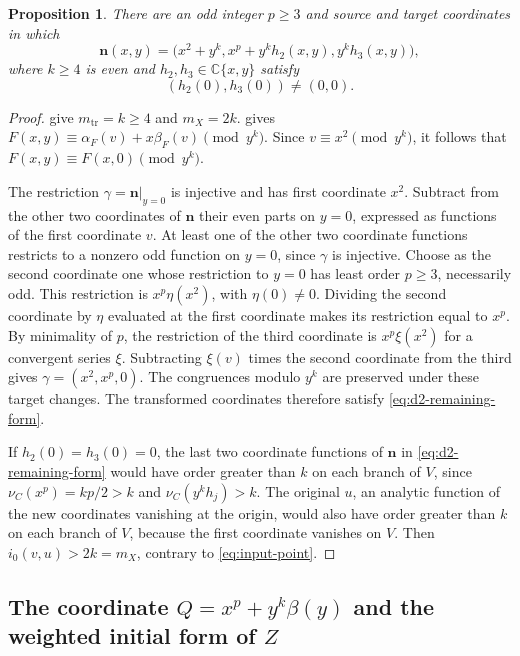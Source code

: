 \documentclass[11pt,letterpaper]{article}
\numberwithin{equation}{section}
\newtheorem{proposition}[proposition]{Proposition}
\theoremstyle{remark}
\theoremstyle{plain}
\newcommand{\C}{\mathbb{C}}
\begin{document}
\begin{proposition}
\label{prop:d2-remaining-form}
There are an odd integer $p\geq3$ and source and target coordinates
in which
\begin{equation}
 \boldsymbol n(x,y)=
 \bigl(x^2+y^k,x^p+y^kh_2(x,y),y^kh_3(x,y)\bigr),
 \label{eq:d2-remaining-form}
\end{equation}
where $k\geq4$ is even and $h_2,h_3\in\C\{x,y\}$ satisfy
\[
 (h_2(0),h_3(0))\neq(0,0).
\]
\end{proposition}

\begin{proof}
 give
$m_{\mathrm{tr}}=k\geq4$ and $m_X=2k$.
 gives
$F(x,y)\equiv\alpha_F(v)+x\beta_F(v)\pmod{y^k}$.  Since
$v\equiv x^2\pmod{y^k}$, it follows that
$F(x,y)\equiv F(x,0)\pmod{y^k}$.

The restriction $\gamma=\boldsymbol n|_{y=0}$ is injective and has
first coordinate $x^2$.  Subtract from the other two coordinates of
$\boldsymbol n$ their even parts on $y=0$, expressed as functions of the first
coordinate $v$.  At least one of the other two coordinate functions
restricts to a nonzero odd function on $y=0$, since $\gamma$ is injective.
Choose as the second coordinate one whose restriction to $y=0$ has
least order $p\geq3$, necessarily odd.  This restriction is $x^p\eta(x^2)$, with
$\eta(0)\neq0$.  Dividing the second coordinate by $\eta$ evaluated
at the first coordinate makes its restriction equal to $x^p$.  By minimality of $p$, the
restriction of the third coordinate is $x^p\xi(x^2)$ for a convergent series $\xi$.
Subtracting $\xi(v)$ times the second coordinate from the third gives
$\gamma=(x^2,x^p,0)$.  The congruences modulo $y^k$
are preserved under these target changes.
The transformed coordinates therefore satisfy \eqref{eq:d2-remaining-form}.

If $h_2(0)=h_3(0)=0$, the last two coordinate functions of $\boldsymbol n$ in
\eqref{eq:d2-remaining-form} would have order greater than $k$ on
each branch of $V$, since $\nu_C(x^p)=kp/2>k$ and
$\nu_C(y^kh_j)>k$.  The original $u$, an analytic function of the
new coordinates vanishing at the origin, would also have order greater than $k$
on each branch of $V$,
because the first coordinate vanishes on $V$.
Then $i_0(v,u)>2k=m_X$, contrary to \eqref{eq:input-point}.
\end{proof}
\subsection{The coordinate \texorpdfstring{$Q=x^p+y^k\beta(y)$}{Q}
and the weighted initial form of \texorpdfstring{$Z$}{Z}}
\end{document}
